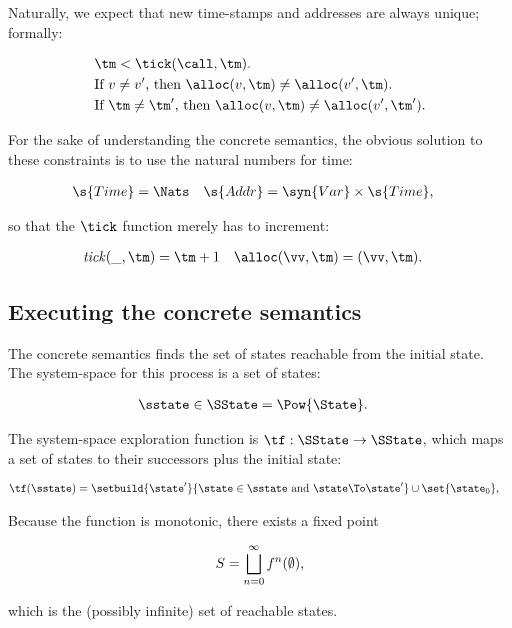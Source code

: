 Naturally, we expect that new time-stamps and addresses are always unique; formally:
\begin{small}\begin{align}
  &\tm < \tick(\call,\tm)\text.
  \\
  &\text{If } 
  v \neq v'
  \text{, then }
  \alloc(v,\tm) \neq
  \alloc(v',\tm)
  \text. 
  \\
  &\text{If } 
  \tm \neq \tm'
  \text{, then }
  \alloc(v,\tm) \neq
  \alloc(v',\tm')
  \text. 
\end{align}\end{small}For the sake of understanding the concrete semantics, the obvious
solution to these constraints is to use the natural numbers for time:
\begin{small}\begin{align*}
  \s{Time} &= \Nats
  &
  \s{Addr} &= \syn{Var} \times \s{Time}
  \text,
\end{align*}\end{small}so that the $\tick$ function merely has to increment:
\begin{small}\begin{align*}
  \mathit{tick}(\_,\tm) & = \tm + 1
  &
  \alloc(\vv,\tm) & = (\vv,\tm)
  \text.
\end{align*}\end{small}



\subsection{Executing the concrete semantics}



The concrete semantics finds the set of states reachable from the
initial state.
The system-space for this process is a set of states:
\begin{small}\begin{align*}
  \sstate \in \SState &= \Pow{\State}
  \text.
\end{align*}\end{small}The system-space exploration function is $\tf : \SState \to \SState$,
which maps a set of states to their successors plus the initial state:
\begin{small}\begin{align*}
  \tf(\sstate) &= \setbuild{ \state' }{ \state \in \sstate \text{ and } \state \To \state' } \cup \set{ \state_0 }
  \text,
\end{align*}\end{small}Because the function is monotonic, there exists a fixed
point
\begin{small}\begin{align*}
  S = \bigsqcup_{n = 0}^\infty f^n(\emptyset)\text,
\end{align*}\end{small}which is the (possibly infinite) set of reachable states.






